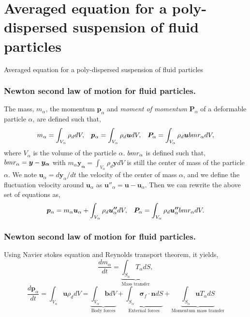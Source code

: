 \documentclass[aspectratio=169]{beamer}
\begin{document}
\section*{Averaged equation for a poly-dispersed suspension of fluid particles}
\begin{frame}
  \vfill
  \centering
  \Huge{Averaged equation for a poly-dispersed suspension of fluid particles}
  \vfill
\end{frame}
\begin{frame}
  \frametitle{Newton second law of motion for fluid particles.}
  The mass, $m_\alpha$, the momentum $\bm{p}_\alpha$ and \textit{moment of momentum} $\bm{P}_\alpha$ of a deformable particle $\alpha$, are defined such that,
  \begin{equation}
      m_\alpha = \int_{V_\alpha} \rho_d dV,\;\;\;
      \bm{p}_\alpha = \int_{V_\alpha} \rho_d \bm{u} dV,\;\;\;
      \bm{P}_\alpha = \int_{V_\alpha} \rho_d \bm{u}\\bm{r}_\alpha dV,
  \end{equation}
  where $V_\alpha$ is the volume of the particle $\alpha$.
  $\\bm{r}_\alpha$ is defined such that, $\\bm{r}_\alpha = \bm{y} - \bm{y_\alpha}$ with $m_\alpha\bm{y_\alpha} = \int_{V_\alpha} \rho_d\bm{y}dV$ is still the center of mass of the particle $\alpha$. 
  We note $\bm{u}_\alpha = d\bm{y}_\alpha/dt$ the velocity of the center of mass $\alpha$, and we define the fluctuation velocity around $\bm{u}_\alpha$ as $\bm{u''}_\alpha = \bm{u} - \bm{u}_\alpha$.
  Then we can rewrite the above set of equations as, 
  \begin{equation}
      \bm{p}_\alpha = m_\alpha \bm{u}_\alpha 
      + \int_{V_\alpha} \rho_d \bm{u''}_\alpha dV,\;\;\;
      \bm{P}_\alpha = \int_{V_\alpha} \rho_d \bm{u''}_\alpha\\bm{r}_\alpha dV.
  \end{equation}
\end{frame}
\begin{frame}
  \frametitle{Newton second law of motion for fluid particles.}
  Using Navier stokes equation and Reynolds transport theorem, it yields,
  \begin{equation}
    \frac{d m_\alpha}{dt} 
    = \underbrace{\int_{S_\alpha} T_\alpha dS}_{\text{Mass transfer}},
  \end{equation}    
  \begin{equation}
    \frac{d\bm{p}_\alpha}{dt} 
    = \int_{V_\alpha} \bm{u} \rho_d dV 
    = \underbrace{\int_{V_\alpha} \bm{b} dV}_{\text{Body forces}} 
    + \underbrace{\int_{S_\alpha} \bm{\sigma}_f \cdot \bm{n} dS}_{\text{External forces}}
    + \underbrace{\int_{S_\alpha} \bm{u} T_\alpha dS}_{\text{Momentum mass transfer}}
  \end{equation}
\end{frame}
\end{document}
